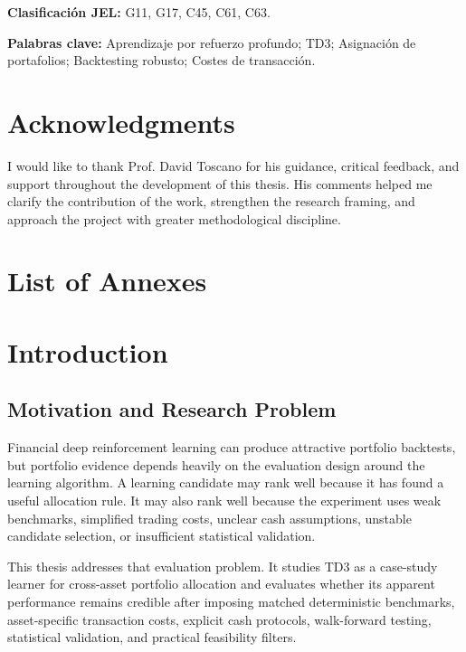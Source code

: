 \documentclass[12pt]{article}
\makeatletter
\newcommand{\listannexname}{List of Annexes}
\newcommand{\listofannexes}{\section*{\listannexname}\@starttoc{loa}}
\makeatother
\begin{document}
\textbf{Clasificación JEL:} G11, G17, C45, C61, C63.

\textbf{Palabras clave:} Aprendizaje por refuerzo profundo; TD3; Asignación de portafolios; Backtesting robusto; Costes de transacción.
\endgroup

\newpage
\section*{Acknowledgments}

I would like to thank Prof. David Toscano for his guidance, critical feedback, and support throughout the development of this thesis. His comments helped me clarify the contribution of the work, strengthen the research framing, and approach the project with greater methodological discipline.

\newpage
\renewcommand{\contentsname}{Table of Contents}
\tableofcontents
\newpage
{}
{}
\listoftables
\newpage
{}
{}
\listoffigures
\newpage
{}
{}
\listofannexes

\newpage
{}

\section{Introduction}

\subsection{Motivation and Research Problem}

Financial deep reinforcement learning can produce attractive portfolio backtests, but portfolio evidence depends heavily on the evaluation design around the learning algorithm. A learning candidate may rank well because it has found a useful allocation rule. It may also rank well because the experiment uses weak benchmarks, simplified trading costs, unclear cash assumptions, unstable candidate selection, or insufficient statistical validation.

This thesis addresses that evaluation problem. It studies TD3 as a case-study learner for cross-asset portfolio allocation and evaluates whether its apparent performance remains credible after imposing matched deterministic benchmarks, asset-specific transaction costs, explicit cash protocols, walk-forward testing, statistical validation, and practical feasibility filters.
\end{document}
